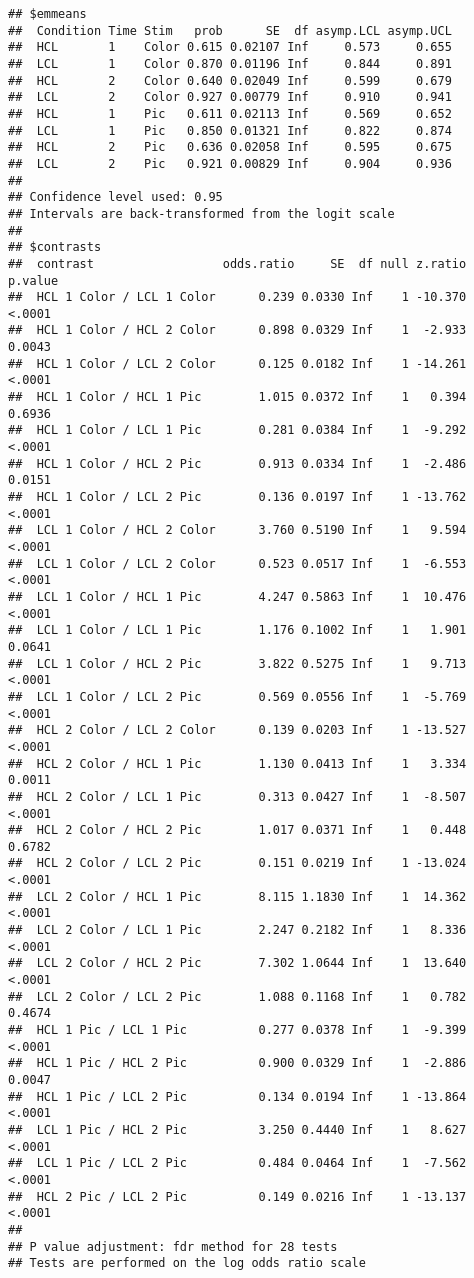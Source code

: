 \documentclass[
]{article}
\begin{document}
\begin{verbatim}
## $emmeans
##  Condition Time Stim   prob      SE  df asymp.LCL asymp.UCL
##  HCL       1    Color 0.615 0.02107 Inf     0.573     0.655
##  LCL       1    Color 0.870 0.01196 Inf     0.844     0.891
##  HCL       2    Color 0.640 0.02049 Inf     0.599     0.679
##  LCL       2    Color 0.927 0.00779 Inf     0.910     0.941
##  HCL       1    Pic   0.611 0.02113 Inf     0.569     0.652
##  LCL       1    Pic   0.850 0.01321 Inf     0.822     0.874
##  HCL       2    Pic   0.636 0.02058 Inf     0.595     0.675
##  LCL       2    Pic   0.921 0.00829 Inf     0.904     0.936
## 
## Confidence level used: 0.95 
## Intervals are back-transformed from the logit scale 
## 
## $contrasts
##  contrast                  odds.ratio     SE  df null z.ratio p.value
##  HCL 1 Color / LCL 1 Color      0.239 0.0330 Inf    1 -10.370  <.0001
##  HCL 1 Color / HCL 2 Color      0.898 0.0329 Inf    1  -2.933  0.0043
##  HCL 1 Color / LCL 2 Color      0.125 0.0182 Inf    1 -14.261  <.0001
##  HCL 1 Color / HCL 1 Pic        1.015 0.0372 Inf    1   0.394  0.6936
##  HCL 1 Color / LCL 1 Pic        0.281 0.0384 Inf    1  -9.292  <.0001
##  HCL 1 Color / HCL 2 Pic        0.913 0.0334 Inf    1  -2.486  0.0151
##  HCL 1 Color / LCL 2 Pic        0.136 0.0197 Inf    1 -13.762  <.0001
##  LCL 1 Color / HCL 2 Color      3.760 0.5190 Inf    1   9.594  <.0001
##  LCL 1 Color / LCL 2 Color      0.523 0.0517 Inf    1  -6.553  <.0001
##  LCL 1 Color / HCL 1 Pic        4.247 0.5863 Inf    1  10.476  <.0001
##  LCL 1 Color / LCL 1 Pic        1.176 0.1002 Inf    1   1.901  0.0641
##  LCL 1 Color / HCL 2 Pic        3.822 0.5275 Inf    1   9.713  <.0001
##  LCL 1 Color / LCL 2 Pic        0.569 0.0556 Inf    1  -5.769  <.0001
##  HCL 2 Color / LCL 2 Color      0.139 0.0203 Inf    1 -13.527  <.0001
##  HCL 2 Color / HCL 1 Pic        1.130 0.0413 Inf    1   3.334  0.0011
##  HCL 2 Color / LCL 1 Pic        0.313 0.0427 Inf    1  -8.507  <.0001
##  HCL 2 Color / HCL 2 Pic        1.017 0.0371 Inf    1   0.448  0.6782
##  HCL 2 Color / LCL 2 Pic        0.151 0.0219 Inf    1 -13.024  <.0001
##  LCL 2 Color / HCL 1 Pic        8.115 1.1830 Inf    1  14.362  <.0001
##  LCL 2 Color / LCL 1 Pic        2.247 0.2182 Inf    1   8.336  <.0001
##  LCL 2 Color / HCL 2 Pic        7.302 1.0644 Inf    1  13.640  <.0001
##  LCL 2 Color / LCL 2 Pic        1.088 0.1168 Inf    1   0.782  0.4674
##  HCL 1 Pic / LCL 1 Pic          0.277 0.0378 Inf    1  -9.399  <.0001
##  HCL 1 Pic / HCL 2 Pic          0.900 0.0329 Inf    1  -2.886  0.0047
##  HCL 1 Pic / LCL 2 Pic          0.134 0.0194 Inf    1 -13.864  <.0001
##  LCL 1 Pic / HCL 2 Pic          3.250 0.4440 Inf    1   8.627  <.0001
##  LCL 1 Pic / LCL 2 Pic          0.484 0.0464 Inf    1  -7.562  <.0001
##  HCL 2 Pic / LCL 2 Pic          0.149 0.0216 Inf    1 -13.137  <.0001
## 
## P value adjustment: fdr method for 28 tests 
## Tests are performed on the log odds ratio scale
\end{verbatim}
\end{document}
